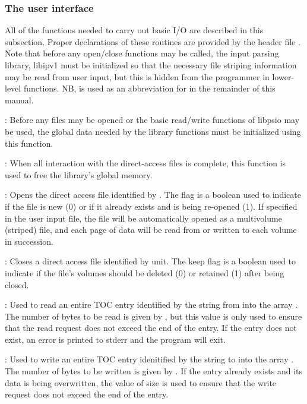 \subsubsection{The user interface}
All of the functions needed to carry out basic I/O are described in
this subsection. Proper declarations of these routines are provided by
the header file . Note that before any open/close
functions may be called, the input parsing library, libipv1 must be
initialized so that the necessary file striping information may be
read from user input, but this is hidden from the programmer in
lower-level functions.  NB,  is used as an abbreviation for
 in the remainder of this manual.

: Before any files may be opened or the
basic read/write functions of libpsio may be used, the global data
needed by the library functions must be initialized using this
function.

: When all interaction with the
direct-access files is complete, this function is used to free the
library's global memory.

: Opens the direct access
file identified by . The  flag is a boolean
used to indicate if the file is new (0) or if it already exists and is
being re-opened (1). If specified in the user input file, the file
will be automatically opened as a multivolume (striped) file, and each
page of data will be read from or written to each volume in
succession.

: Closes a direct access
file identified by unit. The keep flag is a boolean used to indicate
if the file's volumes should be deleted (0) or retained (1) after
being closed.

: Used to read an entire TOC entry identified by the string
 from  into the array . The
number of bytes to be read is given by , but this value is
only used to ensure that the read request does not exceed the end of
the entry. If the entry does not exist, an error is printed to stderr
and the program will exit.

: Used to write an entire TOC entry idenitified by the string
 to  into the array . The number
of bytes to be written is given by . If the entry already
exists and its data is being overwritten, the value of size is used to
ensure that the write request does not exceed the end of the entry.

